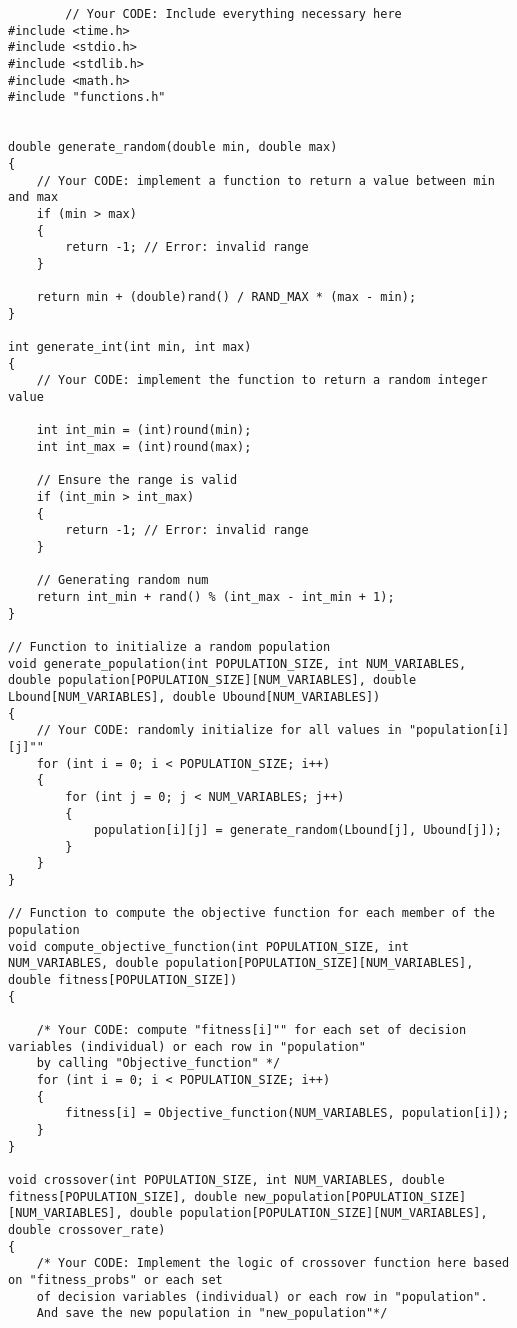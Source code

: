 \documentclass[12pt]{article}
\begin{document}
	\begin{lstlisting}
		// Your CODE: Include everything necessary here
#include <time.h>
#include <stdio.h>
#include <stdlib.h>
#include <math.h>
#include "functions.h"


double generate_random(double min, double max)
{
    // Your CODE: implement a function to return a value between min and max
    if (min > max)
    {
        return -1; // Error: invalid range
    }

    return min + (double)rand() / RAND_MAX * (max - min);
}

int generate_int(int min, int max)
{
    // Your CODE: implement the function to return a random integer value

    int int_min = (int)round(min);
    int int_max = (int)round(max);

    // Ensure the range is valid
    if (int_min > int_max)
    {
        return -1; // Error: invalid range
    }

    // Generating random num
    return int_min + rand() % (int_max - int_min + 1);
}

// Function to initialize a random population
void generate_population(int POPULATION_SIZE, int NUM_VARIABLES, double population[POPULATION_SIZE][NUM_VARIABLES], double Lbound[NUM_VARIABLES], double Ubound[NUM_VARIABLES])
{
    // Your CODE: randomly initialize for all values in "population[i][j]""
    for (int i = 0; i < POPULATION_SIZE; i++)
    {
        for (int j = 0; j < NUM_VARIABLES; j++)
        {
            population[i][j] = generate_random(Lbound[j], Ubound[j]);
        }
    }
}

// Function to compute the objective function for each member of the population
void compute_objective_function(int POPULATION_SIZE, int NUM_VARIABLES, double population[POPULATION_SIZE][NUM_VARIABLES], double fitness[POPULATION_SIZE])
{

    /* Your CODE: compute "fitness[i]"" for each set of decision variables (individual) or each row in "population"
    by calling "Objective_function" */
    for (int i = 0; i < POPULATION_SIZE; i++)
    {
        fitness[i] = Objective_function(NUM_VARIABLES, population[i]);
    }
}

void crossover(int POPULATION_SIZE, int NUM_VARIABLES, double fitness[POPULATION_SIZE], double new_population[POPULATION_SIZE][NUM_VARIABLES], double population[POPULATION_SIZE][NUM_VARIABLES], double crossover_rate)
{
    /* Your CODE: Implement the logic of crossover function here based on "fitness_probs" or each set
    of decision variables (individual) or each row in "population".
    And save the new population in "new_population"*/



\end{lstlisting}
\end{document}
